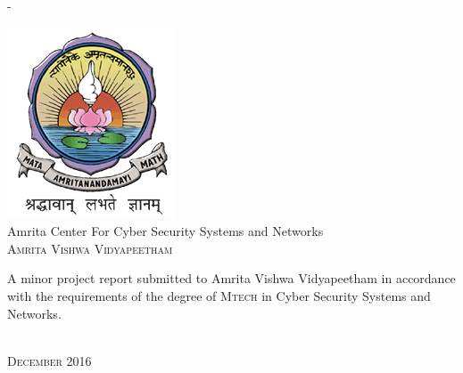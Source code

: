 \begin{titlingpage}
\begin{SingleSpace}
\begin{adjustwidth*}{\unitlength}{-\unitlength}
\begin{center}
\vspace{8mm}
\includegraphics[scale=0.9]{logos/AVV_colour}\\
\vspace{6mm}
{\large Amrita Center For Cyber Security Systems and Networks\\
\textsc{Amrita Vishwa Vidyapeetham}}\\
\vspace{8mm}
\begin{minipage}{10cm}
A minor project report submitted to Amrita Vishwa Vidyapeetham in accordance with the requirements of the degree of \textsc{Mtech} in Cyber Security Systems and Networks.

\end{minipage}\\

\bigskip
{\large\textsc{December 2016}}

\end{center}
\end{adjustwidth*}
\end{SingleSpace}
\end{titlingpage}